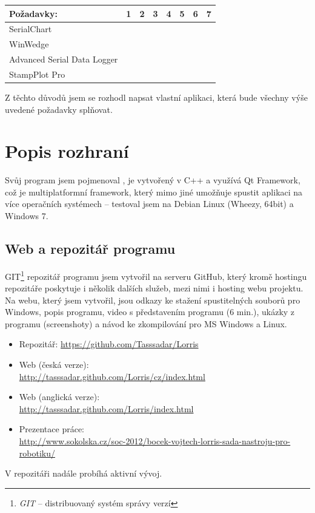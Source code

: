 \documentclass[12pt, a4paper, oneside]{article}
\newcommand{\It}{\textit}  %
\newcommand{\Has}{\textcolor{green}{\CheckmarkBold}}
\newcommand{\NoHas}{\textcolor{red}{\XSolidBrush}}
\begin{document}
\begin{tabular}{ | l | l | l | l | l | l | l | l |}
    \hline
    Požadavky:                  & 1      & 2      & 3      & 4      & 5      & 6      & 7      \\ \hline
    SerialChart                 & \Has   & \NoHas & \Has   & \NoHas & \Has   & \Has   & \Has   \\ \hline 
    WinWedge                    & \NoHas & \Has   & \Has   & \NoHas & \NoHas & \NoHas & \NoHas \\ \hline 
    Advanced Serial Data Logger & \NoHas & \Has   & \Has   & \NoHas & \NoHas & \NoHas & \NoHas \\ \hline 
    StampPlot Pro               & \Has   & \Has   & \NoHas & \NoHas & \Has   & \NoHas & \Has   \\ \hline 
\end{tabular}

\vspace{5mm}

Z těchto důvodů jsem se rozhodl napsat vlastní aplikaci, která bude všechny výše uvedené požadavky splňovat.

\section{Popis rozhraní}
Svůj program jsem pojmenoval , je vytvořený v C++ a využívá Qt Framework\cite{qtfrm}, což je multiplatformní framework, který mimo jiné umožňuje spustit aplikaci na více operačních systémech -- testoval jsem na Debian Linux\cite{debian} (Wheezy, 64bit) a Windows 7.

\subsection{Web a repozitář programu}
GIT\footnote{\It{GIT} -- distribuovaný systém správy verzí} repozitář programu jsem vytvořil na serveru GitHub\cite{github}, který kromě hostingu repozitáře poskytuje i několik dalších služeb, mezi nimi i hosting webu projektu. Na webu, který jsem vytvořil, jsou odkazy ke stažení spustitelných souborů pro Windows, popis programu, video s představením programu (6 min.), ukázky z programu (screenshoty) a návod ke zkompilování pro MS Windows a Linux.

\begin{itemize}
    \item Repozitář: \url{https://github.com/Tasssadar/Lorris}
    \item Web (česká verze):\\ \url{http://tasssadar.github.com/Lorris/cz/index.html}
    \item Web (anglická verze):\\ \url{http://tasssadar.github.com/Lorris/index.html}
    \item Prezentace práce: \\ \url{http://www.sokolska.cz/soc-2012/bocek-vojtech-lorris-sada-nastroju-pro-robotiku/}
\end{itemize}
V repozitáři nadále probíhá aktivní vývoj.
\end{document}
